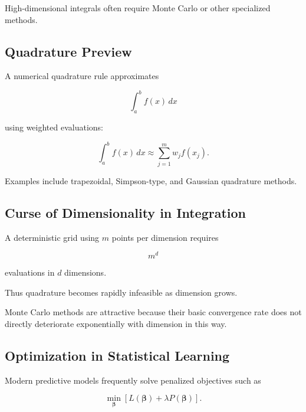 High-dimensional integrals often require Monte Carlo or other specialized
methods.

\subsection{Quadrature Preview}
\label{subsec:quadrature-preview}

A numerical quadrature rule approximates

\[
\int_a^b
f(x)\,dx
\]

using weighted evaluations:

\[
\boxed{
\int_a^b
f(x)\,dx
\approx
\sum_{j=1}^{m}
w_j
f(x_j).
}
\]

Examples include trapezoidal, Simpson-type, and Gaussian quadrature
methods.

\subsection{Curse of Dimensionality in Integration}
\label{subsec:integration-curse-dimensionality}

A deterministic grid using \(m\) points per dimension requires

\[
\boxed{
m^d
}
\]

evaluations in \(d\) dimensions.

Thus quadrature becomes rapidly infeasible as dimension grows.

Monte Carlo methods are attractive because their basic convergence rate
does not directly deteriorate exponentially with dimension in this way.

\subsection{Optimization in Statistical Learning}
\label{subsec:optimization-statistical-learning}

Modern predictive models frequently solve penalized objectives such as

\[
\boxed{
\min_{\boldsymbol{\beta}}
\left[
L
(
\boldsymbol{\beta}
)
+
\lambda
P
(
\boldsymbol{\beta}
)
\right].
}
\]

